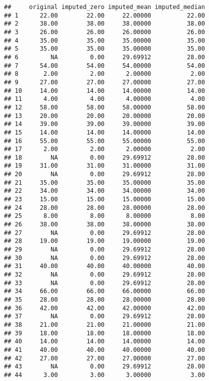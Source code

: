 \documentclass[
]{article}
\begin{document}
\begin{verbatim}
##     original imputed_zero imputed_mean imputed_median
## 1      22.00        22.00     22.00000          22.00
## 2      38.00        38.00     38.00000          38.00
## 3      26.00        26.00     26.00000          26.00
## 4      35.00        35.00     35.00000          35.00
## 5      35.00        35.00     35.00000          35.00
## 6         NA         0.00     29.69912          28.00
## 7      54.00        54.00     54.00000          54.00
## 8       2.00         2.00      2.00000           2.00
## 9      27.00        27.00     27.00000          27.00
## 10     14.00        14.00     14.00000          14.00
## 11      4.00         4.00      4.00000           4.00
## 12     58.00        58.00     58.00000          58.00
## 13     20.00        20.00     20.00000          20.00
## 14     39.00        39.00     39.00000          39.00
## 15     14.00        14.00     14.00000          14.00
## 16     55.00        55.00     55.00000          55.00
## 17      2.00         2.00      2.00000           2.00
## 18        NA         0.00     29.69912          28.00
## 19     31.00        31.00     31.00000          31.00
## 20        NA         0.00     29.69912          28.00
## 21     35.00        35.00     35.00000          35.00
## 22     34.00        34.00     34.00000          34.00
## 23     15.00        15.00     15.00000          15.00
## 24     28.00        28.00     28.00000          28.00
## 25      8.00         8.00      8.00000           8.00
## 26     38.00        38.00     38.00000          38.00
## 27        NA         0.00     29.69912          28.00
## 28     19.00        19.00     19.00000          19.00
## 29        NA         0.00     29.69912          28.00
## 30        NA         0.00     29.69912          28.00
## 31     40.00        40.00     40.00000          40.00
## 32        NA         0.00     29.69912          28.00
## 33        NA         0.00     29.69912          28.00
## 34     66.00        66.00     66.00000          66.00
## 35     28.00        28.00     28.00000          28.00
## 36     42.00        42.00     42.00000          42.00
## 37        NA         0.00     29.69912          28.00
## 38     21.00        21.00     21.00000          21.00
## 39     18.00        18.00     18.00000          18.00
## 40     14.00        14.00     14.00000          14.00
## 41     40.00        40.00     40.00000          40.00
## 42     27.00        27.00     27.00000          27.00
## 43        NA         0.00     29.69912          28.00
## 44      3.00         3.00      3.00000           3.00

\end{verbatim}
\end{document}
